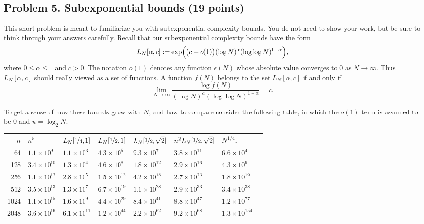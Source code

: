 \documentclass[11pt]{article}
\theoremstyle{definition}
\begin{document}
\subsection*{Problem 5. Subexponential bounds (19 points)}
This short problem is meant to familiarize you with subexponential complexity bounds.
You do not need to show your work, but be sure to think through your answers carefully.
Recall that our subexponential complexity bounds have the form
\[
L_N[\alpha,c] := \exp\Bigl(\bigl(c+o(1)\bigr)(\log N)^\alpha(\log\log N)^{1-\alpha}\Bigr),
\]
where $0\le \alpha\le 1$ and $c >0$.  The notation $o(1)$ denotes any function $\epsilon(N)$ whose absolute value converges to 0 as $N\to\infty$.
Thus $L_N[\alpha,c]$ should really viewed as a set of functions.
A function $f(N)$ belongs to the set $L_N[\alpha,c]$ if and only if
\[
\lim_{N\to\infty} \frac{\log f(N)}{(\log N)^\alpha(\log\log N)^{1-\alpha}} = c.
\]

To get a sense of how these bounds grow with $N$,  and how to compare consider the following table, in which the $o(1)$ term is assumed to be 0 and $n=\log_2 N$.
\setlength{\extrarowheight}{2pt}
\begin{center}
\begin{tabular}{rlllllll}
$n$& $n^5$ & $L_N[\nicefrac{1}{4},1]$& $L_N[\nicefrac{1}{2},1]$ & $L_N[\nicefrac{1}{2},\sqrt{2}]$ & $n^2L_N[\nicefrac{1}{2},\sqrt{2}]$ & $N^{1/4}$.\\\hline
64  &$1.1\times 10^{9}	$&$1.1\times 10^{3}	$&$4.3\times 10^{5}	$&$9.3\times 10^{7}	$&$3.8\times 10^{11}	$&$6.6\times 10^{4}$\\
128 &$3.4\times 10^{10}	$&$1.3\times 10^{4}	$&$4.6\times 10^{8}	$&$1.8\times 10^{12}	$&$2.9\times 10^{16}	$&$4.3\times 10^{9}$\\
256 &$1.1\times 10^{12}	$&$2.8\times 10^{5}	$&$1.5\times 10^{13}	$&$4.2\times 10^{18}	$&$2.7\times 10^{23}	$&$1.8\times 10^{19}$\\
512 &$3.5\times 10^{13}	$&$1.3\times 10^{7}	$&$6.7\times 10^{19}	$&$1.1\times 10^{28}	$&$2.9\times 10^{33}	$&$3.4\times 10^{38}$\\
1024&$1.1\times 10^{15}	$&$1.6\times 10^{9}	$&$4.4\times 10^{29}	$&$8.4\times 10^{41}	$&$8.8\times 10^{47}	$&$1.2\times 10^{77}$\\
2048&$3.6\times 10^{16}	$&$6.1\times 10^{11}	$&$1.2\times 10^{44}	$&$2.2\times 10^{62}	$&$9.2\times 10^{68}	$&$1.3\times 10^{154}$\\\hline
\end{tabular}
\end{center}
\end{document}
